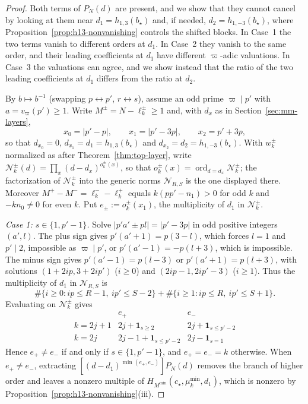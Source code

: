 \documentclass[twoside,10pt]{article}
\numberwithin{equation}{section}
\theoremstyle{slbody}
\theoremstyle{definition}
\theoremstyle{remark}
\newcommand{\ord}{\operatorname{ord}}
\begin{document}
\begin{proof}
Both terms of \(P_N(d)\) are present, and we show that they cannot cancel by
looking at them near \(d_1=h_{1,3}(b_\star)\) and, if needed,
\(d_2=h_{1,-3}(b_\star)\), where Proposition~\ref{prop:h13-nonvanishing}
controls the shifted blocks.  In Case~1 the two terms vanish to different
orders at \(d_1\).  In Case~2 they vanish to the same order, and their leading
coefficients at \(d_1\) have different \(\varpi\)-adic valuations.  In Case~3 the
valuations can agree, and we show instead that the ratio of the two leading
coefficients at \(d_1\) differs from the ratio at \(d_2\).

By \(b\mapsto b^{-1}\) (swapping \(p\leftrightarrow p'\),
\(r\leftrightarrow s\)), assume an odd prime \(\varpi\mid p'\) with
\(a=v_\varpi(p')\geq1\).  Write \(M^\pm=N-\ell^\pm_k\geq1\) and, with
\(d_x\) as in Section~\ref{sec:mm-layers},
\[
 x_0=|p'-p|,\qquad x_1=|p'-3p|,\qquad x_2=p'+3p,
\]
so that \(d_{x_0}=0\), \(d_{x_1}=d_1=h_{1,3}(b_\star)\) and
\(d_{x_2}=d_2=h_{1,-3}(b_\star)\).  With \(w^\pm_k\) normalized as after
Theorem~\ref{thm:top-layer}, write
\(\mathcal N^\pm_k(d)=\prod_x(d-d_x)^{o^\pm_k(x)}\), so that
\(o^\pm_k(x)=\ord_{d=d_x}\mathcal N^\pm_k\); the factorization of
\(\mathcal N^\pm_k\) into the generic norms \({\mathcal N}_{R,S}\) is the one
displayed there.  Moreover \(M^+-M^-=\ell^-_k-\ell^+_k\) equals \(k(pp'-n_1)>0\) for odd \(k\)
and \(-kn_0\neq0\) for even \(k\).  Put \(e_\pm:=o^\pm_k(x_1)\), the
multiplicity of \(d_1\) in \(\mathcal N^\pm_k\).

\emph{Case 1: \(s\in\{1,p'-1\}\).}  Solve \(|p'a'\pm pl|=|p'-3p|\) in odd
positive integers \((a',l)\).  The plus sign gives \(p'(a'+1)=p(3-l)\), which
forces \(l=1\) and \(p'\mid2\), impossible as \(\varpi\mid p'\), or
\(p'(a'-1)=-p(l+3)\), which is impossible.  The minus sign gives
\(p'(a'-1)=p(l-3)\) or \(p'(a'+1)=p(l+3)\), with solutions
\((1+2ip,3+2ip')\) (\(i\geq0\)) and \((2ip-1,2ip'-3)\) (\(i\geq1\)).  Thus the
multiplicity of \(d_1\) in \({\mathcal N}_{R,S}\) is
\[
 \#\{i\geq0:ip\leq R-1,\ ip'\leq S-2\}+\#\{i\geq1:ip\leq R,\ ip'\leq S+1\}.
\]
Evaluating on \(\mathcal N^\pm_k\) gives
\[
 \begin{array}{c|cc}
  & e_+ & e_-\\\hline
  k=2j+1 & 2j+\mathbf 1_{s\geq2} & 2j+\mathbf 1_{s\leq p'-2}\\
  k=2j & 2j-1+\mathbf 1_{s\leq p'-2} & 2j-\mathbf 1_{s=1}
 \end{array}
\]
Hence \(e_+\neq e_-\) if and only if \(s\in\{1,p'-1\}\), and \(e_+=e_-=k\)
otherwise.  When \(e_+\neq e_-\), extracting
\([(d-d_1)^{\min(e_+,e_-)}]P_N(d)\) removes the branch of higher order and
leaves a nonzero multiple of \(H_{M^{\min}}(c_\star,\mu^{\min}_k,d_1)\), which
is nonzero by Proposition~\ref{prop:h13-nonvanishing}(iii).


\end{proof}
\end{document}
